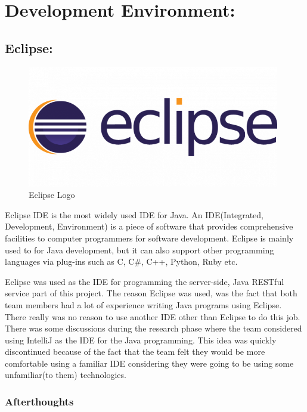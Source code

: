 \section{Development Environment:}
\bigskip


\subsection{Eclipse:}
\label{sec:TechnologyReviewEclipse}
\begin{figure}[H]
    \centering
    \includegraphics[width=\textwidth, height=150pt]{img/eclipseLogo.png}
    \caption{Eclipse Logo}
    \label{fig:my_label}
\end{figure}

\bigskip

Eclipse IDE is the most widely used IDE for Java. An IDE(Integrated, Development, Environment) is a piece of software that provides  comprehensive facilities to computer programmers for software development. Eclipse is mainly used to for Java development, but it can also support other programming languages via plug-ins such as C, C\#, C++, Python, Ruby etc. 

\bigskip

Eclipse was used as the IDE for programming the server-side, Java RESTful service part of this project. The reason Eclipse was used, was the fact that both team members had a lot of experience writing Java programs using Eclipse. There really was no reason to use another IDE other than Eclipse to do this job. There was some discussions during the research phase where the team considered using IntelliJ as the IDE for the Java programming. This idea was quickly discontinued because of the fact that the team felt they would be more comfortable using a familiar IDE considering they were going to be using some unfamiliar(to them) technologies.

\subsubsection{Afterthoughts}

